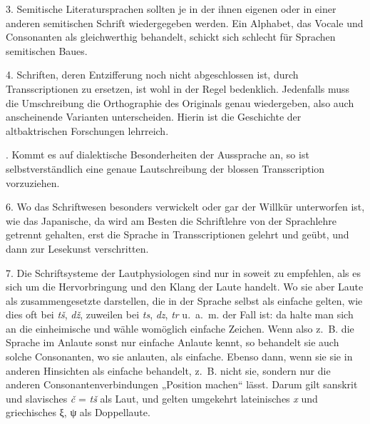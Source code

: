 3. Semitische Literatursprachen sollten je in der ihnen eigenen oder in einer anderen semitischen Schrift wiedergegeben werden. Ein Alphabet, das Vocale und Consonanten als gleichwerthig behandelt, schickt sich schlecht für Sprachen semitischen Baues.

4. Schriften, deren Entzifferung noch nicht abgeschlossen ist, durch Transscriptionen zu ersetzen, ist wohl in der Regel bedenklich. Jedenfalls muss die Umschreibung die Orthographie des Originals genau wiedergeben, also auch anscheinende Varianten unterscheiden. Hierin ist die Geschichte der altbaktrischen Forschungen lehrreich.

. Kommt es auf dialektische Besonderheiten der Aussprache an, so ist selbstverständlich eine genaue Lautschreibung der blossen Transscription vorzuziehen.

6. Wo das Schriftwesen besonders verwickelt oder gar der Willkür unterworfen ist, wie das Japanische, da wird am Besten die Schriftlehre von der \label{sp.135} Sprachlehre getrennt gehalten, erst die Sprache in Transscriptionen gelehrt und geübt, und dann zur Lesekunst verschritten.

7. Die Schriftsysteme der Lautphysiologen sind nur in soweit zu empfehlen, als es sich um die Hervorbringung und den Klang der Laute handelt. Wo sie aber Laute als zusammengesetzte darstellen, die in der \label{fp.144} Sprache selbst als einfache gelten, wie dies oft bei \textit{tš}, \textit{dž}, zuweilen bei \textit{ts}, \textit{dz}, \textit{tr} u.~a.~m. der Fall ist: da halte man sich an die einheimische  und wähle womöglich einfache Zeichen. Wenn also z.~B. die Sprache im Anlaute sonst nur einfache Anlaute kennt, so behandelt sie auch solche Consonanten, wo sie anlauten, als einfache. Ebenso dann, wenn sie sie in anderen Hinsichten als einfache behandelt, z.~B. nicht sie, sondern nur die anderen Consonantenverbindungen „Position machen“ lässt. Darum gilt sanskrit  und slavisches \textit{č} = \textit{tš} als  Laut, und gelten umgekehrt lateinisches \textit{x} und griechisches ξ, ψ als Doppellaute.


